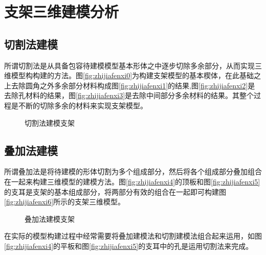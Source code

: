\section{支架三维建模分析}

\subsection{切割法建模}
所谓切割法是从具备包容待建模模型基本形体之中逐步切除多余部分，从而实现三维模型构构建的方法。图\ref{fig:zhijiafenxi0}为构建支架模型的基本楔体，在此基础之上去除圆角之外多余部分材料构成图\ref{fig:zhijiafenxi1}的结果,图\ref{fig:zhijiafenxi2}是去除孔材料的结果，图\ref{fig:zhijiafenxi3}是去除中间部分多余材料的结果。其整个过程是不断的切除多余的材料来实现支架模型。

\begin{figure}[htbp]
\centering
{}\hspace{20pt}
\hspace{20pt}
\hspace{20pt}
\caption{切割法建模支架}
\end{figure}

\subsection{叠加法建模}

所谓叠加法是将待建模的形体切割为多个组成部分，然后将各个组成部分叠加组合在一起来构建三维模型的建模方法。图\ref{fig:zhijiafenxi4}的顶板和图\ref{fig:zhijiafenxi5}的支耳是支架的基本组成部分，将两部分有效的组合在一起即可构建图\ref{fig:zhijiafenxi6}所示的支架三维模型。

\begin{figure}[htbp]
\centering
{}\hspace{20pt}
\hspace{20pt}
\caption{叠加法建模支架}
\end{figure}

在实际的模型构建过程中经常需要将叠加建模法和切割建模法组合起来运用，如图\ref{fig:zhijiafenxi4}的平板和图\ref{fig:zhijiafenxi5}的支耳中的孔是运用切割法来完成。

\endinput